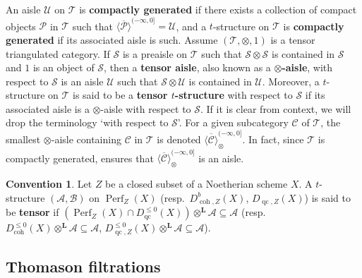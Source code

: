 \documentclass[11pt]{amsart}
\theoremstyle{plain}
\theoremstyle{definition}
\newtheorem{convention}[theorem]{Convention}
\numberwithin{equation}{section}
\numberwithin{theorem}{section}
\begin{document}
An aisle $\mathcal{U}$ on $\mathcal{T}$ is \textbf{compactly generated} if there exists a collection of compact objects $\mathcal{P}$ in $\mathcal{T}$ such that $\overline{ \langle \mathcal{P} \rangle}^{(-\infty,0]} = \mathcal{U}$, and a $t$-structure on $\mathcal{T}$ is \textbf{compactly generated} if its associated aisle is such. Assume $(\mathcal{T},\otimes,1)$ is a tensor triangulated category. If $\mathcal{S}$ is a preaisle on $\mathcal{T}$ such that $\mathcal{S}\otimes \mathcal{S}$ is contained in $\mathcal{S}$ and $1$ is an object of $\mathcal{S}$, then a \textbf{tensor aisle}, also known as a \textbf{$\otimes$-aisle}, with respect to $\mathcal{S}$ is an aisle $\mathcal{U}$ such that $\mathcal{S} \otimes \mathcal{U}$ is contained in $\mathcal{U}$. Moreover, a $t$-structure on $\mathcal{T}$ is said to be a \textbf{tensor $t$-structure} with respect to $\mathcal{S}$ if its associated aisle is a $\otimes$-aisle with respect to $\mathcal{S}$. If it is clear from context, we will drop the terminology `with respect to $\mathcal{S}$'. For a given subcategory $\mathcal{C}$ of $\mathcal{T}$, the smallest $\otimes$-aisle containing $\mathcal{C}$ in $\mathcal{T}$ is denoted $\overline{ \langle \mathcal{C} \rangle}^{(-\infty,0]}_{\otimes}$. In fact, since $\mathcal{T}$ is compactly generated, \cite[Proposition 3.3]{Hrbek/Lank/LeGros/Pavon:2026} ensures that $\overline{ \langle \mathcal{C} \rangle}^{(-\infty,0]}_{\otimes}$ is an aisle.

\begin{convention}
    Let $Z$ be a closed subset of a Noetherian scheme $X$. A $t$-structure $(\mathcal{A},\mathcal{B})$ on $\operatorname{Perf}_Z (X)$ (resp.\ $D^b_{\operatorname{coh},Z}(X)$, $D_{\operatorname{qc},Z}(X)$) is said to be \textbf{tensor} if $(\operatorname{Perf}_Z (X) \cap D^{\leq 0}_{\operatorname{qc}}(X) )\otimes^{\mathbf{L}} \mathcal{A} \subseteq \mathcal{A}$ (resp.\ $D^{\leq 0}_{\operatorname{coh}}(X) \otimes^{\mathbf{L}}\mathcal{A} \subseteq \mathcal{A}$, $D^{\leq 0}_{\operatorname{qc},Z}(X) \otimes^{\mathbf{L}} \mathcal{A} \subseteq \mathcal{A}$). 
\end{convention}

\subsection{Thomason filtrations}
\label{sec:thomason_ftilration}
\end{document}
